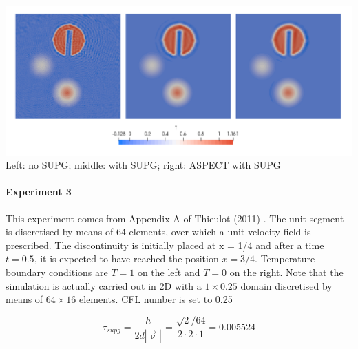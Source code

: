 \begin{center}
\includegraphics[width=15cm]{python_codes/fieldstone_43/results/experiment2/Temps}\\
{\captionfont Left: no SUPG; middle: with SUPG; right: ASPECT with SUPG}
\end{center}


\paragraph{Experiment 3}

This experiment comes from Appendix A of Thieulot (2011) \cite{thie11}.
The unit segment is discretised by means of 64 elements, 
over which a unit velocity field is prescribed.
The discontinuity is initially
placed at x = 1/4 and after a time $t=0.5$, it is expected to have
reached the position $x=3/4$.
Temperature boundary conditions are $T=1$ on the left and $T=0$ on the right. 
Note that the simulation is actually carried out in 2D with a $1\times0.25$ domain 
discretised by means of $64\times16$ elements.
CFL number is set to 0.25




\[
\tau_{supg} = \frac{h}{2 d |\vec{\upnu}|} = \frac{\sqrt{2}/64}{2 \cdot 2 \cdot 1} = 0.005524
\]

